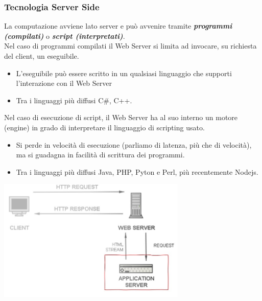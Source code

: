 \subsubsection{Tecnologia Server Side}
La computazione avviene lato server e può avvenire tramite \textbf{\textit{programmi (compilati)}} o \textbf{\textit{script (interpretati)}}.
\\Nel caso di programmi compilati il Web Server si limita ad invocare, su richiesta del client, un eseguibile.
\begin{itemize}
    \item L'eseguibile può essere scritto in un qualsiasi linguaggio che supporti l'interazione con il Web Server
    \item Tra i linguaggi più diffusi C\#, C++.
\end{itemize}
Nel caso di esecuzione di script, il Web Server ha al suo interno un motore (engine) in grado di interpretare il linguaggio di scripting usato.
\begin{itemize}
    \item Si perde in velocità di esecuzione (parliamo di latenza, più che di velocità), ma si guadagna in facilità di scrittura dei programmi.
    \item Tra i linguaggi più diffusi Java, PHP, Pyton e Perl, più recentemente Nodejs.
\end{itemize}
\begin{center}
    \includegraphics[width=0.675\textwidth]{img/appWeb2.jpg}
\end{center}

